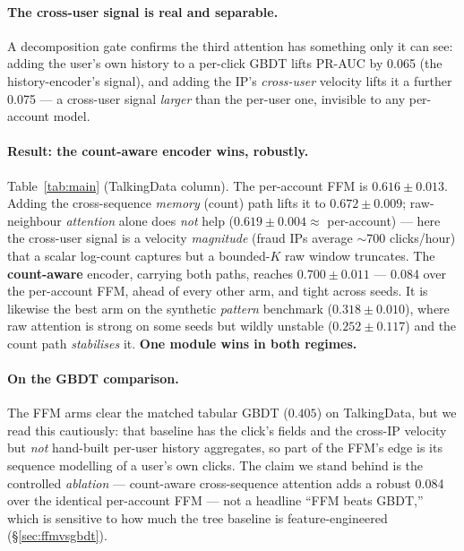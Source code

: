 \paragraph{The cross-user signal is real and separable.} A decomposition gate confirms the third
attention has something only it can see: adding the user's own history to a per-click GBDT lifts
PR-AUC by \num{+0.065} (the history-encoder's signal), and adding the IP's \emph{cross-user}
velocity lifts it a further \num{+0.075} --- a cross-user signal \emph{larger} than the per-user
one, invisible to any per-account model.

\paragraph{Result: the count-aware encoder wins, robustly.} Table~\ref{tab:main} (TalkingData
column). The per-account FFM is $0.616\pm0.013$. Adding the cross-sequence \emph{memory} (count)
path lifts it to $0.672\pm0.009$; raw-neighbour \emph{attention} alone does \emph{not} help
($0.619\pm0.004\approx$ per-account) --- here the cross-user signal is a velocity \emph{magnitude}
(fraud IPs average $\sim$\num{700} clicks/hour) that a scalar log-count captures but a bounded-$K$
raw window truncates. The \textbf{count-aware} encoder, carrying both paths, reaches
$\mathbf{0.700\pm0.011}$ --- \num{+0.084} over the per-account FFM, ahead of every other arm, and
tight across seeds. It is likewise the best arm on the synthetic \emph{pattern} benchmark
($0.318\pm0.010$), where raw attention is strong on some seeds but wildly unstable
($0.252\pm0.117$) and the count path \emph{stabilises} it. \textbf{One module wins in both
regimes.}

\paragraph{On the GBDT comparison.} The FFM arms clear the matched tabular GBDT
($0.405$) on TalkingData, but we read this cautiously: that baseline has the click's fields and the
cross-IP velocity but \emph{not} hand-built per-user history aggregates, so part of the FFM's edge
is its sequence modelling of a user's own clicks. The claim we stand behind is the controlled
\emph{ablation} --- count-aware cross-sequence attention adds a robust \num{+0.084} over the
identical per-account FFM --- not a headline ``FFM beats GBDT,'' which is sensitive to how much the
tree baseline is feature-engineered (\S\ref{sec:ffmvsgbdt}).
